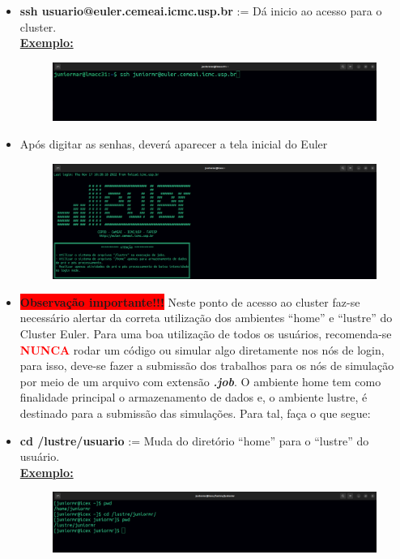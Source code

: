 \documentclass[12pt]{article}
\begin{document}
\begin{itemize}
	\item \textbf{ssh usuario@euler.cemeai.icmc.usp.br} :=  Dá inicio ao acesso para o cluster.\\ \textbf{\underline{Exemplo:}}
	\begin{figure}[htb]
		\centering
		\includegraphics[trim = 0mm 60mm 190mm 0mm,clip,width=1.05\linewidth]{figures/login_euler.png}
		\label{fig:logineuler}
	\end{figure}
    \item[] Após digitar as senhas, deverá aparecer a tela inicial do Euler
    \begin{figure}[htb]
    	\centering
    	\includegraphics[trim = 0mm 0mm 190mm 0mm,clip,width=1.05\linewidth]{figures/login_euler_2.png}
    	\label{fig:logineuler2}
    \end{figure}
	\item \textbf{\colorbox{red}{Observação importante!!!}} Neste ponto de acesso ao cluster faz-se necessário alertar da correta utilização dos ambientes ``home'' e ``lustre'' do Cluster Euler. Para uma boa utilização de todos os usuários, recomenda-se \textbf{\textcolor{red}{NUNCA}} rodar um código ou simular algo diretamente nos nós de login, para isso, deve-se fazer a submissão dos trabalhos para os nós de simulação por meio de um arquivo com extensão \textbf{\textit{.job}}. O ambiente home tem como finalidade principal o armazenamento de dados e, o ambiente lustre, é destinado para a submissão das simulações. Para tal, faça o que segue:
	\item \textbf{cd /lustre/usuario} := Muda do diretório ``home'' para o ``lustre'' do usuário.\\ \textbf{\underline{Exemplo:}}
	\begin{figure}[htb]
		\centering
		\includegraphics[trim = 0mm 20mm 190mm 0mm,clip,width=1.05\linewidth]{figures/mudar_para_lustre.png}
		\label{fig:muda_lustre}
	\end{figure}	
	

\end{itemize}
\end{document}
